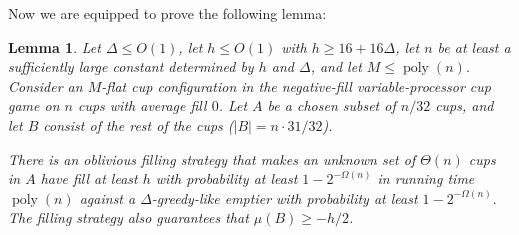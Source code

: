 \documentclass[twocolumn]{article}[10pt]
\DeclareMathOperator{\poly}{\text{poly}}
\newtheorem{lemma}{Lemma}
\begin{document}
Now we are equipped to prove the following lemma:
\begin{lemma}
  \label{lem:obliviousManyUnknownCups}
  Let $\Delta \le O(1)$, let $h \le O(1)$ with $h \ge 16+16\Delta$, let
  $n$ be at least a sufficiently large constant
  determined by $h$ and $\Delta$, and let $M \le \poly(n)$.
  Consider an $M$-flat cup configuration in the negative-fill
  variable-processor cup game on $n$ cups with average fill $0$.
  Let $A$ be a chosen subset of $n/32$ cups, and let $B$ consist
  of the rest of the cups ($|B| = n\cdot 31/32$).

  There is an oblivious filling strategy that makes an unknown
  set of $\Theta(n)$ cups in $A$ have fill at least $h$ with
  probability at least $1-2^{-\Omega(n)}$ in running time
  $\poly(n)$ against a $\Delta$-greedy-like emptier with
  probability at least $1-2^{-\Omega(n)}.$
  The filling strategy also guarantees that $\mu(B) \ge -h/2$.

\end{lemma}
\end{document}
